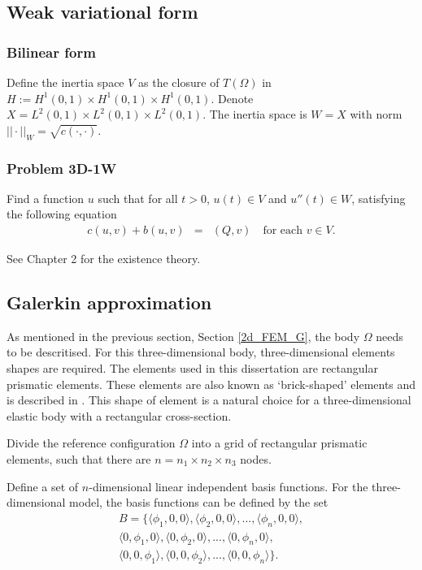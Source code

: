\documentclass[../../main.tex]{subfiles}
\begin{document}
\subsection{Weak variational form}

\subsubsection{Bilinear form}
Define the inertia space $V$ as the closure of $T(\Omega)$ in $H := H^1(0,1)\times H^1(0,1)\times H^1(0,1)$. Denote $X = L^2(0,1)\times L^2(0,1)\times L^2(0,1)$. The inertia space is $W  = X$ with norm $||\cdot||_W = \sqrt{c(\cdot,\cdot)}$.

\subsubsection{Problem 3D-1W}
Find a function $u$ such that for all $t>0$, $u(t) \in V$ and $u''(t) \in W$, satisfying the following equation
\begin{eqnarray}
	c(u,v) + b(u,v) & = & (Q,v) \ \ \ \textrm{ for each } v \in V.
\end{eqnarray}

See Chapter 2 for the existence theory.

\subsection{Galerkin approximation}
As mentioned in the previous section, Section \ref{2d_FEM_G}, the body $\Omega$ needs to be descritised. For this three-dimensional body, three-dimensional elements shapes are required. The elements used in this dissertation are rectangular prismatic elements. These elements are also known as `brick-shaped' elements and is described in \cite{Wu06}. This shape of element is a natural choice for a three-dimensional elastic body with a rectangular cross-section.

Divide the reference configuration $\Omega$ into a grid of rectangular prismatic elements, such that there are $n = n_1 \times n_2 \times n_3$ nodes.

Define a set of $n$-dimensional linear independent basis functions. For the three-dimensional model, the basis functions can be defined by the set
\begin{eqnarray*}
 B = \{\langle\phi_1, 0 , 0\rangle, \langle\phi_2, 0, 0\rangle,...,\langle\phi_{n}, 0, 0 \rangle,\\
	\langle 0,\phi_1 ,0 \rangle,\langle 0 ,\phi_2,0\rangle,...,\langle 0,\phi_{n},0\rangle,\\
	\langle 0,0,\phi_1 \rangle,\langle 0,0,\phi_2\rangle,...,\langle 0,0,\phi_{n}\rangle \}.
\end{eqnarray*}
\end{document}
